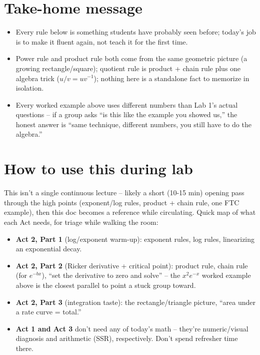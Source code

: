 \documentclass[12pt,]{article}
\providecommand{\tightlist}{%
  \setlength{\itemsep}{0pt}\setlength{\parskip}{0pt}}
\begin{document}
\section{Take-home message}\label{take-home-message}

\begin{itemize}
\tightlist
\item
  Every rule below is something students have probably seen before;
  today's job is to make it fluent again, not teach it for the first
  time.
\item
  Power rule and product rule both come from the same geometric picture
  (a growing rectangle/square); quotient rule is product + chain rule
  plus one algebra trick (\(u/v=uv^{-1}\)); nothing here is a standalone
  fact to memorize in isolation.
\item
  Every worked example above uses different numbers than Lab 1's actual
  questions -- if a group asks ``is this like the example you showed
  us,'' the honest answer is ``same technique, different numbers, you
  still have to do the algebra.''
\end{itemize}

\section{How to use this during lab}\label{how-to-use-this-during-lab}

This isn't a single continuous lecture -- likely a short (10-15 min)
opening pass through the high points (exponent/log rules, product +
chain rule, one FTC example), then this doc becomes a reference while
circulating. Quick map of what each Act needs, for triage while walking
the room:

\begin{itemize}
\tightlist
\item
  \textbf{Act 2, Part 1} (log/exponent warm-up): exponent rules, log
  rules, linearizing an exponential decay.
\item
  \textbf{Act 2, Part 2} (Ricker derivative + critical point): product
  rule, chain rule (for \(e^{-bx}\)), ``set the derivative to zero and
  solve'' -- the \(x^2e^{-x}\) worked example above is the closest
  parallel to point a stuck group toward.
\item
  \textbf{Act 2, Part 3} (integration taste): the rectangle/triangle
  picture, ``area under a rate curve = total.''
\item
  \textbf{Act 1 and Act 3} don't need any of today's math -- they're
  numeric/visual diagnosis and arithmetic (SSR), respectively. Don't
  spend refresher time there.
\end{itemize}
\end{document}
